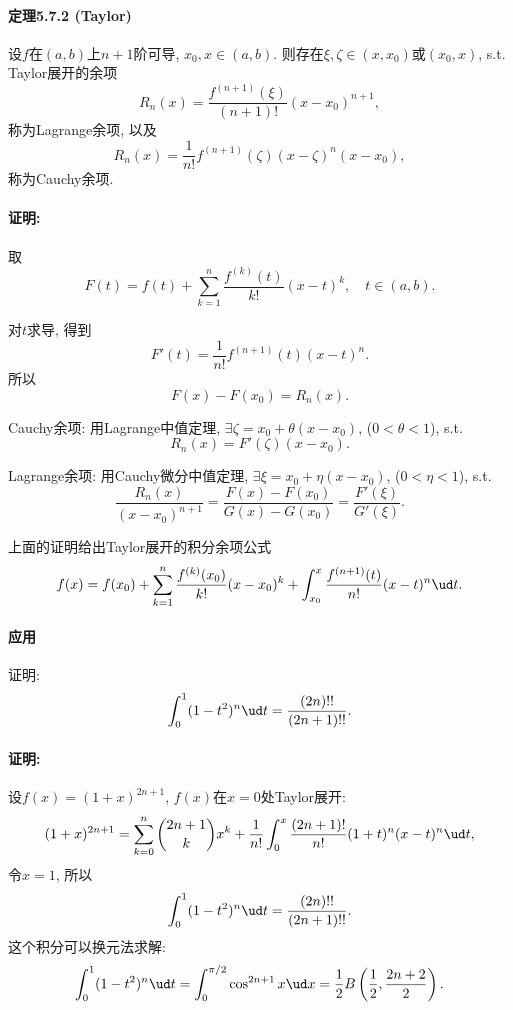 \paragraph{定理5.7.2 (Taylor)}

设$f$在$(a,b)$上$n+1$阶可导, $x_{0},x\in(a,b)$. 则存在$\xi,\zeta\in(x,x_{0})$或$(x_{0},x)$,
s.t. Taylor展开的余项
\[
R_{n}(x)=\frac{f^{(n+1)}(\xi)}{(n+1)!}(x-x_{0})^{n+1},
\]
称为Lagrange余项, 以及
\[
R_{n}(x)=\frac{1}{n!}f^{(n+1)}(\zeta)(x-\zeta)^{n}(x-x_{0}),
\]
称为Cauchy余项.

\paragraph{证明:}

取
\[
F(t)=f(t)+\sum_{k=1}^{n}\frac{f^{(k)}(t)}{k!}(x-t)^{k},\quad t\in(a,b).
\]

对$t$求导, 得到
\[
F'(t)=\frac{1}{n!}f^{(n+1)}(t)(x-t)^{n}.
\]
所以
\[
F(x)-F(x_{0})=R_{n}(x).
\]

Cauchy余项: 用Lagrange中值定理, $\exists\zeta=x_{0}+\theta(x-x_{0})$, ($0<\theta<1$),
s.t.
\[
R_{n}(x)=F'(\zeta)(x-x_{0}).
\]

Lagrange余项: 用Cauchy微分中值定理, $\exists\xi=x_{0}+\eta(x-x_{0})$, ($0<\eta<1$),
s.t.
\[
\frac{R_{n}(x)}{(x-x_{0})^{n+1}}=\frac{F(x)-F(x_{0})}{G(x)-G(x_{0})}=\frac{F'(\xi)}{G'(\xi)}.
\]

上面的证明给出Taylor展开的积分余项公式
\[
f(x)=f(x_{0})+\sum_{k=1}^{n}\frac{f^{(k)}(x_{0})}{k!}(x-x_{0})^{k}+\int_{x_{0}}^{x}\frac{f^{(n+1)}(t)}{n!}(x-t)^{n}\ud t.
\]


\paragraph{应用}

证明: 
\[
\int_{0}^{1}(1-t^{2})^{n}\ud t=\frac{(2n)!!}{(2n+1)!!}.
\]


\paragraph{证明:}

设$f(x)=(1+x)^{2n+1}$, $f(x)$在$x=0$处Taylor展开:
\[
(1+x)^{2n+1}=\sum_{k=0}^{n}\binom{2n+1}{k}x^{k}+\frac{1}{n!}\int_{0}^{x}\frac{(2n+1)!}{n!}(1+t)^{n}(x-t)^{n}\ud t,
\]
令$x=1$, 所以
\[
\int_{0}^{1}(1-t^{2})^{n}\ud t=\frac{(2n)!!}{(2n+1)!!}.
\]
这个积分可以换元法求解:
\[
\int_{0}^{1}(1-t^{2})^{n}\ud t=\int_{0}^{\pi/2}\cos^{2n+1}x\ud x=\frac{1}{2}B\left(\frac{1}{2},\frac{2n+2}{2}\right).
\]


